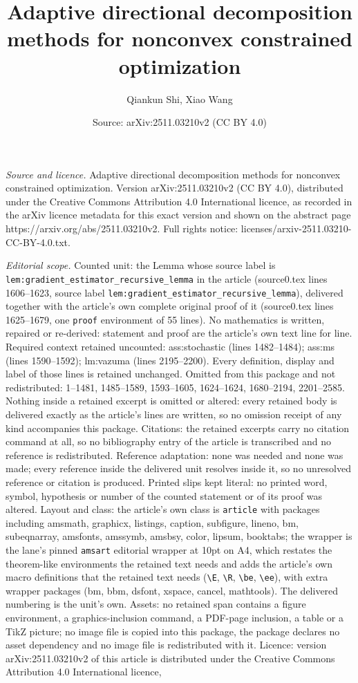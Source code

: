 \documentclass[10pt,a4paper]{amsart}
\title[Adaptive directional decomposition methods for nonconvex con]{Adaptive directional decomposition methods for nonconvex constrained optimization}
\author{Qiankun Shi, Xiao Wang}
\date{Source: arXiv:2511.03210v2 (CC BY 4.0)}
\begin{document}
\maketitle

\noindent\emph{Source and licence.} Adaptive directional decomposition methods for nonconvex constrained optimization. Version arXiv:2511.03210v2 (CC BY 4.0), distributed under the Creative Commons Attribution 4.0 International licence, as recorded in the arXiv licence metadata for this exact version and shown on the abstract page https://arxiv.org/abs/2511.03210v2. Full rights notice: licenses/arxiv-2511.03210-CC-BY-4.0.txt.\par\smallskip

\noindent\textit{Editorial scope.} Counted unit: the Lemma whose source label is \texttt{lem:gradient\_estimator\_recursive\_lemma} in the article (source0.tex lines 1606--1623, source label \texttt{lem:gradient\_estimator\_recursive\_lemma}), delivered together with the article's own complete original proof of it (source0.tex lines 1625--1679, one \texttt{proof} environment of 55 lines). No mathematics is written, repaired or re-derived: statement and proof are the article's own text line for line. Required context retained uncounted: ass:stochastic (lines 1482--1484); ass:ms (lines 1590--1592); lm:vazuma (lines 2195--2200). Every definition, display and label of those lines is retained unchanged. Omitted from this package and not redistributed: 1--1481, 1485--1589, 1593--1605, 1624--1624, 1680--2194, 2201--2585. Nothing inside a retained excerpt is omitted or altered: every retained body is delivered exactly as the article's lines are written, so no omission receipt of any kind accompanies this package. Citations: the retained excerpts carry no citation command at all, so no bibliography entry of the article is transcribed and no reference is redistributed. Reference adaptation: none was needed and none was made; every reference inside the delivered unit resolves inside it, so no unresolved reference or citation is produced. Printed slips kept literal: no printed word, symbol, hypothesis or number of the counted statement or of its proof was altered. Layout and class: the article's own class is \texttt{article} with packages including amsmath, graphicx, listings, caption, subfigure, lineno, bm, subeqnarray, amsfonts, amssymb, amsbsy, color, lipsum, booktabs; the wrapper is the lane's pinned \texttt{amsart} editorial wrapper at 10pt on A4, which restates the theorem-like environments the retained text needs and adds the article's own macro definitions that the retained text needs (\texttt{\textbackslash E}, \texttt{\textbackslash R}, \texttt{\textbackslash be}, \texttt{\textbackslash ee}), with extra wrapper packages (bm, bbm, dsfont, xspace, cancel, mathtools). The delivered numbering is the unit's own. Assets: no retained span contains a figure environment, a graphics-inclusion command, a PDF-page inclusion, a table or a TikZ picture; no image file is copied into this package, the package declares no asset dependency and no image file is redistributed with it. Licence: version arXiv:2511.03210v2 of this article is distributed under the Creative Commons Attribution 4.0 International licence, 
\end{document}
